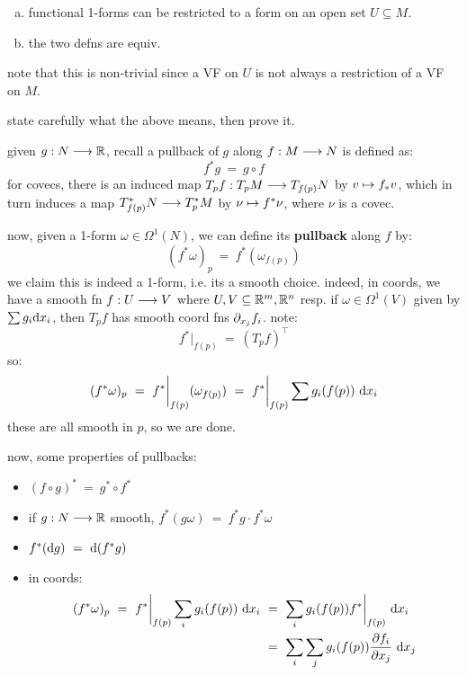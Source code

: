 \begin{prop}\vspace{-0.2in}
	\begin{enumerate}[a)]
		\item functional 1-forms can be restricted to a form on an open
			set $U\subseteq M$.
		\item the two defns are equiv.
	\end{enumerate}
\end{prop}
note that this is non-trivial since a VF on $U$ is not always a restriction of
a VF on $M$.
\begin{exr}
	state carefully what the above means, then prove it.
\end{exr}

given $g:N\longrightarrow\mathbb{R}$, recall a pullback of $g$ along $f:M\longrightarrow N$ is defined as:
\begin{equation*}
	f^{*}g \ = \ g\circ f
\end{equation*}
for covecs, there is an induced map $T_{p}f:T_{p}M\longrightarrow T_{f(p)}N$ by
$v\mapsto f_{*}v$, which in turn induces a map $T_{f(p)}^{*}N\longrightarrow T_{p}^{*}M$ by
$\nu\mapsto f^{*}\nu$, where $\nu$ is a covec.

now, given a 1-form $\omega\in\Omega^{1}(N)$, we can define its \textbf{pullback} along $f$ by:
\begin{equation*}
	(f^{*}\omega)_{p} \ = \ f^{*}(\omega_{f(p)})
\end{equation*}
we claim this is indeed a 1-form, i.e. its a smooth choice.
indeed, in coords, we have a smooth fn $f:U\longrightarrow V$ where
$U,V\subseteq\mathbb{R}^{m},\mathbb{R}^{n}$ resp.
if $\omega\in\Omega^{1}(V)$ given by $\sum g_{i}\textrm{d} x_{i}$, then $T_{p}f$ has smooth
coord fns $\partial_{x_{j}}f_{i}$. note:
\begin{equation*}
	f^{*}\big\rvert_{f(p)} \ = \ (T_{p}f)^{\intercal}
\end{equation*}
so:
\begin{equation*}
	(f^{*}\omega)_{p} \ = \ f^{*}\bigg\rvert_{f(p)}(\omega_{f(p)})
	\ = \ f^{*}\bigg\rvert_{f(p)}\sum g_{i}(f(p))\di x_{i}
\end{equation*}
these are all smooth in $p$, so we are done.

now, some properties of pullbacks:
\begin{itemize}
	\item $(f\circ g)^{*} \ = \ g^{*}\circ f^{*}$
	\item if $g:N\longrightarrow\mathbb{R}$ smooth, $f^{*}(g\omega) \ = \ f^{*}g \cdot f^{*}\omega$
	\item $f^{*}(\d g) \ = \ \d(f^{*}g)$
	\item in coords:
		\begin{align*}
			(f^{*}\omega)_{p} \ = \ f^{*}\bigg\rvert_{f(p)}\sum_{i}g_{i}(f(p))\di x_{i}
			& \ = \ \sum_{i}g_{i}(f(p))f^{*}\bigg\rvert_{f(p)}\di x_{i} \\
			& \ = \ \sum_{i}\sum_{j}g_{i}(f(p))\frac{\p f_{i}}{\p x_{j}}\di x_{j}
		\end{align*}
\end{itemize}

